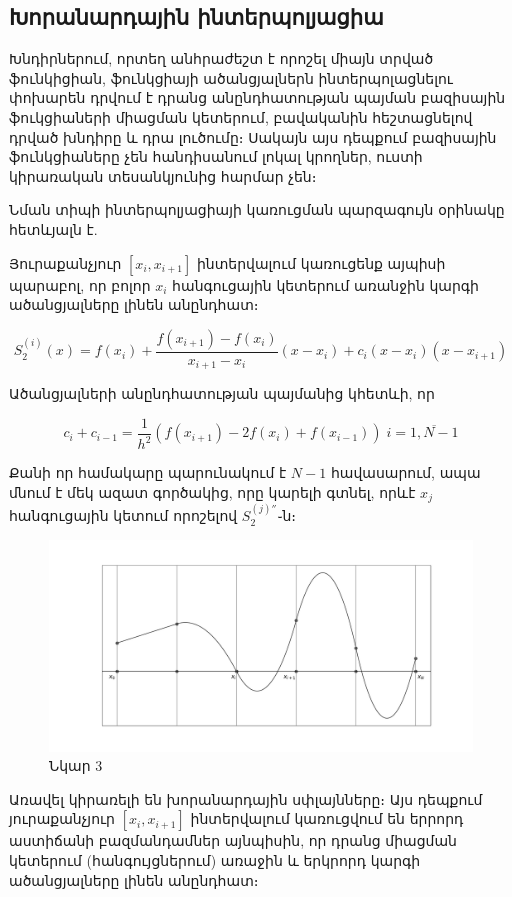 \documentclass[fleqn, bachelor,subf,12pt,notitlepage]{disser}
\begin{document}
\newpage

\subsection*{Խորանարդային ինտերպոլյացիա}

Խնդիրներում, որտեղ անհրաժեշտ է որոշել միայն տրված ֆունկիցիան, ֆունկցիայի ածանցյալներն ինտերպոլացնելու փոխարեն դրվում է դրանց անընդհատության պայման բազիսային ֆուկցիաների միացման կետերում,  բավականին հեշտացնելով դրված խնդիրը և դրա լուծումը։ Սակայն այս դեպքում բազիսային ֆունկցիաները չեն հանդիսանում լոկալ կրողներ, ուստի կիրառական տեսանկյունից հարմար չեն։

Նման տիպի ինտերպոլյացիայի կառուցման պարզագույն օրինակը հետևյալն է.

\noindent Յուրաքանչյուր $\left[x_{i}, x_{i+1}\right]$ ինտերվալում կառուցենք այպիսի պարաբոլ, որ բոլոր $x_{i}$ հանգուցային կետերում առանջին կարգի ածանցյալները լինեն անընդհատ։

$$S_{2}^{(i)}(x)=f(x_{i})+\dfrac{f(x_{i+1})-f(x_{i})}{x_{i+1}-x_{i}}\left(x-x_{i}\right)+c_{i}\left(x-x_{i}\right)\left(x-x_{i+1}\right)$$

\noindent Ածանցյալների անընդհատության պայմանից կհետևի, որ

$$c_{i}+c_{i-1}=\dfrac{1}{h^{2}}\left(f(x_{i+1})-2f(x_{i})+f(x_{i-1})\right) \; i=\overline{1, N-1}$$

Քանի որ համակարը պարունակում է $N-1$ հավասարում, ապա մնում է մեկ ազատ գործակից, որը կարելի գտնել, որևէ $x_{j}$ հանգուցային կետում որոշելով $S_{2}^{(j)''}$֊ն։

\begin{figure}[h!]
\centering
\includegraphics[width=1.0\textwidth]{images/image_8}
\captionsetup{labelformat=empty}
\caption{\hfill Նկար 3}
\end{figure}

Առավել կիրառելի են խորանարդային սփլայնները։ Այս դեպքում յուրաքանչյուր $\left[x_{i}, x_{i+1}\right]$ ինտերվալում կառուցվում են երրորդ աստիճանի բազմանդամներ այնպիսին, որ դրանց միացման կետերում (հանգույցներում) առաջին և երկրորդ կարգի ածանցյալները լինեն անընդհատ։ 
\end{document}
